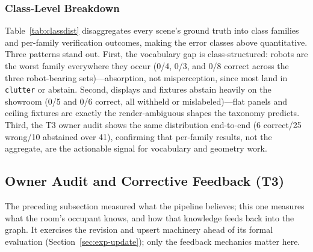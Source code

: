 \documentclass[electronics,article,accept,pdftex,moreauthors]{Definitions/mdpi}
\begin{document}
\subsubsection{Class-Level Breakdown}
Table~\ref{tab:classdist} disaggregates every scene's ground truth into
class families and per-family verification outcomes, making the error
classes above quantitative. Three patterns stand out. First, the
vocabulary gap is class-structured: robots are the worst family
everywhere they occur (0/4, 0/3, and 0/8 correct across the three
robot-bearing sets)---absorption, not misperception, since most land in
\texttt{clutter} or abstain. Second, displays and fixtures abstain
heavily on the showroom (0/5 and 0/6 correct, all withheld or
mislabeled)---flat panels and ceiling fixtures are exactly the
render-ambiguous shapes the taxonomy predicts. Third, the T3 owner audit
shows the same distribution end-to-end (6 correct/25 wrong/10
abstained over 41), confirming that per-family results, not the
aggregate, are the actionable signal for vocabulary and geometry work.

\subsection{Owner Audit and Corrective Feedback (T3)}
\label{sec:exp-owner}

The preceding subsection measured what the pipeline believes; this one
measures what the room's occupant knows, and how that knowledge feeds
back into the graph. It exercises the revision and upsert machinery ahead
of its formal evaluation (Section~\ref{sec:exp-update}); only the feedback
mechanics matter here.
\end{document}
